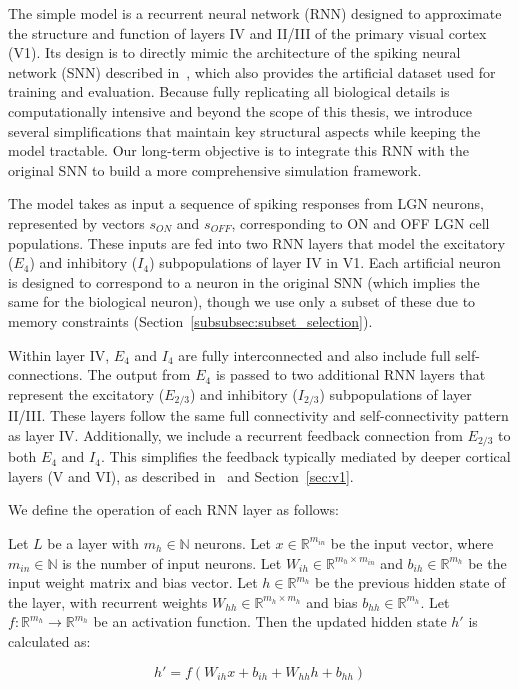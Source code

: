 The simple model is a recurrent neural network (RNN) designed to approximate the structure and function of layers IV and II/III of the primary visual cortex (V1). Its design is to directly mimic the architecture of the spiking neural network (SNN) described in~\citet{antolik2024comprehensive}, which also provides the artificial dataset used for training and evaluation. Because fully replicating all biological details is computationally intensive and beyond the scope of this thesis, we introduce several simplifications that maintain key structural aspects while keeping the model tractable. Our long-term objective is to integrate this RNN with the original SNN to build a more comprehensive simulation framework.

The model takes as input a sequence of spiking responses from LGN neurons, represented by vectors $s_{ON}$ and $s_{OFF}$, corresponding to ON and OFF LGN cell populations. These inputs are fed into two RNN layers that model the excitatory ($E_4$) and inhibitory ($I_4$) subpopulations of layer IV in V1. Each artificial neuron is designed to correspond to a neuron in the original SNN (which implies the same for the biological neuron), though we use only a subset of these due to memory constraints (Section~\ref{subsubsec:subset_selection}).

Within layer IV, $E_4$ and $I_4$ are fully interconnected and also include full self-connections. The output from $E_4$ is passed to two additional RNN layers that represent the excitatory ($E_{2/3}$) and inhibitory ($I_{2/3}$) subpopulations of layer II/III. These layers follow the same full connectivity and self-connectivity pattern as layer IV. Additionally, we include a recurrent feedback connection from $E_{2/3}$ to both $E_4$ and $I_4$. This simplifies the feedback typically mediated by deeper cortical layers (V and VI), as described in~\citet{antolik2024comprehensive} and Section~\ref{sec:v1}.

We define the operation of each RNN layer as follows:

\begin{defn}
    Let $L$ be a layer with $m_h \in \mathbb{N}$ neurons. Let $x \in \mathbb{R}^{m_{in}}$ be the input vector, where $m_{in} \in \mathbb{N}$ is the number of input neurons. Let $W_{ih} \in \mathbb{R}^{m_h \times m_{in}}$ and $b_{ih} \in \mathbb{R}^{m_h}$ be the input weight matrix and bias vector. Let $h \in \mathbb{R}^{m_h}$ be the previous hidden state of the layer, with recurrent weights $W_{hh} \in \mathbb{R}^{m_h \times m_h}$ and bias $b_{hh} \in \mathbb{R}^{m_h}$. Let $f: \mathbb{R}^{m_h} \to \mathbb{R}^{m_h}$ be an activation function. Then the updated hidden state $h'$ is calculated as:
    
    $$h' = f\left(W_{ih}x + b_{ih} + W_{hh}h + b_{hh}\right)$$
\end{defn}
\label{def:base_neuron}

